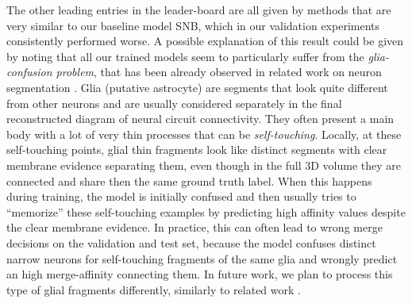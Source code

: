 The other leading entries in the leader-board are all given by methods that are very similar to our baseline model SNB, which in our validation experiments consistently performed worse.
A possible explanation of this result could be given by noting that all our trained models seem to particularly suffer from the \emph{glia-confusion problem}, that has been already observed in related work on neuron segmentation . Glia (putative astrocyte) are segments that look quite different from other neurons and are usually considered separately in the final reconstructed diagram of neural circuit connectivity. They often present a main body with a lot of very thin processes that can be \emph{self-touching}. 
Locally, at these self-touching points, glial thin fragments look like distinct segments with clear membrane evidence separating them, even though in the full 3D volume they are connected and share then the same ground truth label.
When this happens during training, the model is initially confused and then usually tries to ``memorize'' these self-touching examples by predicting high affinity values despite the clear membrane evidence.
In practice, this can often lead to wrong merge decisions on the validation and test set, because the model confuses distinct narrow neurons for self-touching fragments of the same glia and wrongly predict an high merge-affinity connecting them.
In future work, we plan to process this type of glial fragments differently, similarly to related work .

